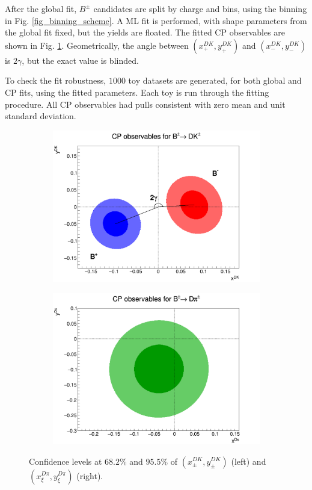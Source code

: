 \documentclass[12pt, a4paper, notitlepage, onecolumn]{article}
\begin{document}
After the global fit, $B^\pm$ candidates are split by charge and bins, using the binning in Fig. \ref{fig_binning_scheme}. A ML fit is performed, with shape parameters from the global fit fixed, but the yields are floated. The fitted CP observables are shown in Fig. \ref{fig_cp_observables}. Geometrically, the angle between $(x_+^{DK}, y_+^{DK})$ and $(x_-^{DK}, y_-^{DK})$ is $2\gamma$, but the exact value is blinded.

To check the fit robustness, $1000$ toy datasets are generated, for both global and CP fits, using the fitted parameters. Each toy is run through the fitting procedure. All CP observables had pulls consistent with zero mean and unit standard deviation.

\begin{figure}[H] 
  \centering
  \begin{subfigure}{0.50\textwidth}
    \centering
    \includegraphics[width=1\textwidth]{Plots/CPContours.png}
  \end{subfigure}%
  \begin{subfigure}{0.50\textwidth}
    \centering
    \includegraphics[width=1\textwidth]{Plots/CPXiContours.png}
  \end{subfigure}
  \caption{Confidence levels at $68.2\%$ and $95.5\%$ of $(x_\pm^{DK}, y_\pm^{DK})$ (left) and $(x_\xi^{D\pi}, y_\xi^{D\pi})$ (right).}
  \label{fig_cp_observables}
\end{figure}
\end{document}
